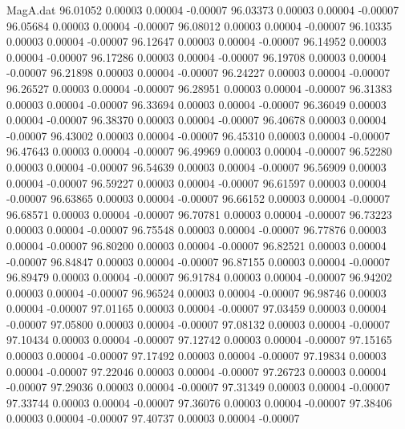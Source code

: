 \begin{filecontents}{MagA.dat}
  96.01052    0.00003    0.00004   -0.00007
  96.03373    0.00003    0.00004   -0.00007
  96.05684    0.00003    0.00004   -0.00007
  96.08012    0.00003    0.00004   -0.00007
  96.10335    0.00003    0.00004   -0.00007
  96.12647    0.00003    0.00004   -0.00007
  96.14952    0.00003    0.00004   -0.00007
  96.17286    0.00003    0.00004   -0.00007
  96.19708    0.00003    0.00004   -0.00007
  96.21898    0.00003    0.00004   -0.00007
  96.24227    0.00003    0.00004   -0.00007
  96.26527    0.00003    0.00004   -0.00007
  96.28951    0.00003    0.00004   -0.00007
  96.31383    0.00003    0.00004   -0.00007
  96.33694    0.00003    0.00004   -0.00007
  96.36049    0.00003    0.00004   -0.00007
  96.38370    0.00003    0.00004   -0.00007
  96.40678    0.00003    0.00004   -0.00007
  96.43002    0.00003    0.00004   -0.00007
  96.45310    0.00003    0.00004   -0.00007
  96.47643    0.00003    0.00004   -0.00007
  96.49969    0.00003    0.00004   -0.00007
  96.52280    0.00003    0.00004   -0.00007
  96.54639    0.00003    0.00004   -0.00007
  96.56909    0.00003    0.00004   -0.00007
  96.59227    0.00003    0.00004   -0.00007
  96.61597    0.00003    0.00004   -0.00007
  96.63865    0.00003    0.00004   -0.00007
  96.66152    0.00003    0.00004   -0.00007
  96.68571    0.00003    0.00004   -0.00007
  96.70781    0.00003    0.00004   -0.00007
  96.73223    0.00003    0.00004   -0.00007
  96.75548    0.00003    0.00004   -0.00007
  96.77876    0.00003    0.00004   -0.00007
  96.80200    0.00003    0.00004   -0.00007
  96.82521    0.00003    0.00004   -0.00007
  96.84847    0.00003    0.00004   -0.00007
  96.87155    0.00003    0.00004   -0.00007
  96.89479    0.00003    0.00004   -0.00007
  96.91784    0.00003    0.00004   -0.00007
  96.94202    0.00003    0.00004   -0.00007
  96.96524    0.00003    0.00004   -0.00007
  96.98746    0.00003    0.00004   -0.00007
  97.01165    0.00003    0.00004   -0.00007
  97.03459    0.00003    0.00004   -0.00007
  97.05800    0.00003    0.00004   -0.00007
  97.08132    0.00003    0.00004   -0.00007
  97.10434    0.00003    0.00004   -0.00007
  97.12742    0.00003    0.00004   -0.00007
  97.15165    0.00003    0.00004   -0.00007
  97.17492    0.00003    0.00004   -0.00007
  97.19834    0.00003    0.00004   -0.00007
  97.22046    0.00003    0.00004   -0.00007
  97.26723    0.00003    0.00004   -0.00007
  97.29036    0.00003    0.00004   -0.00007
  97.31349    0.00003    0.00004   -0.00007
  97.33744    0.00003    0.00004   -0.00007
  97.36076    0.00003    0.00004   -0.00007
  97.38406    0.00003    0.00004   -0.00007
  97.40737    0.00003    0.00004   -0.00007

\end{filecontents}
